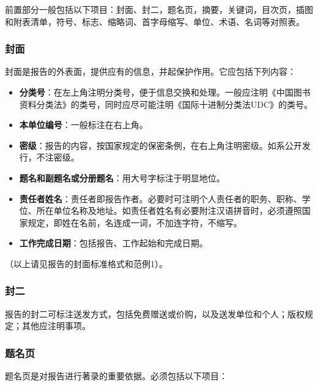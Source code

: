 前置部分一般包括以下项目：封面、封二，题名页，摘要，关键词，目次页，插图和附表清单，符号、标志、缩略词、首字母缩写、单位、术语、名词等对照表。

\subsubsection{封面}

封面是报告的外表面，提供应有的信息，并起保护作用。它应包括下列内容：

\begin{itemize}[leftmargin=2em]
    \item[a.] \textbf{分类号}：在左上角注明分类号，便于信息交换和处理。一般应注明《中国图书资料分类法》的类号，同时应尽可能注明《国际十进制分类法UDC》的类号。
    \item[b.] \textbf{本单位编号}：一般标注在右上角。
    \item[c.] \textbf{密级}：报告的内容，按国家规定的保密条例，在右上角注明密级。如系公开发行，不注密级。
    \item[d.] \textbf{题名和副题名或分册题名}：用大号字标注于明显地位。
    \item[e.] \textbf{责任者姓名}：责任者即报告作者。必要时可注明个人责任者的职务、职称、学位、所在单位名称及地址。如责任者姓名有必要附注汉语拼音时，必须遵照国家规定，即姓在名前，名连成一词，不加连字符，不缩写。
    \item[f.] \textbf{工作完成日期}：包括报告、工作起始和完成日期。
\end{itemize}

（以上请见报告的封面标准格式和范例1）。

\subsubsection{封二}

报告的封二可标注送发方式，包括免费赠送或价购，以及送发单位和个人；版权规定；其他应注明事项。

\subsubsection{题名页}

题名页是对报告进行著录的重要依据。必须包括以下项目：

